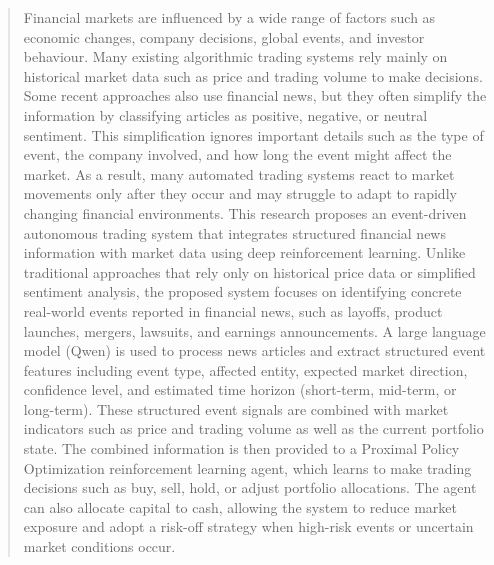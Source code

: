 \documentclass[a4paper,fleqn]{cas-sc}
\begin{document}



\begin{abstract}
Financial markets are influenced by a wide range of factors such as economic changes, company decisions, global events, and investor behaviour. Many existing algorithmic trading systems rely mainly on historical market data such as price and trading volume to make decisions. Some recent approaches also use financial news, but they often simplify the information by classifying articles as positive, negative, or neutral sentiment. This simplification ignores important details such as the type of event, the company involved, and how long the event might affect the market. As a result, many automated trading systems react to market movements only after they occur and may struggle to adapt to rapidly changing financial environments. 
This research proposes an event-driven autonomous trading system that integrates structured financial news information with market data using deep reinforcement learning. Unlike traditional approaches that rely only on historical price data or simplified sentiment analysis, the proposed system focuses on identifying concrete real-world events reported in financial news, such as layoffs, product launches, mergers, lawsuits, and earnings announcements. A large language model (Qwen) is used to process news articles and extract structured event features including event type, affected entity, expected market direction, confidence level, and estimated time horizon (short-term, mid-term, or long-term). These structured event signals are combined with market indicators such as price and trading volume as well as the current portfolio state. The combined information is then provided to a Proximal Policy Optimization reinforcement learning agent, which learns to make trading decisions such as buy, sell, hold, or adjust portfolio allocations. The agent can also allocate capital to cash, allowing the system to reduce market exposure and adopt a risk-off strategy when high-risk events or uncertain market conditions occur. 

\end{abstract}
\end{document}
